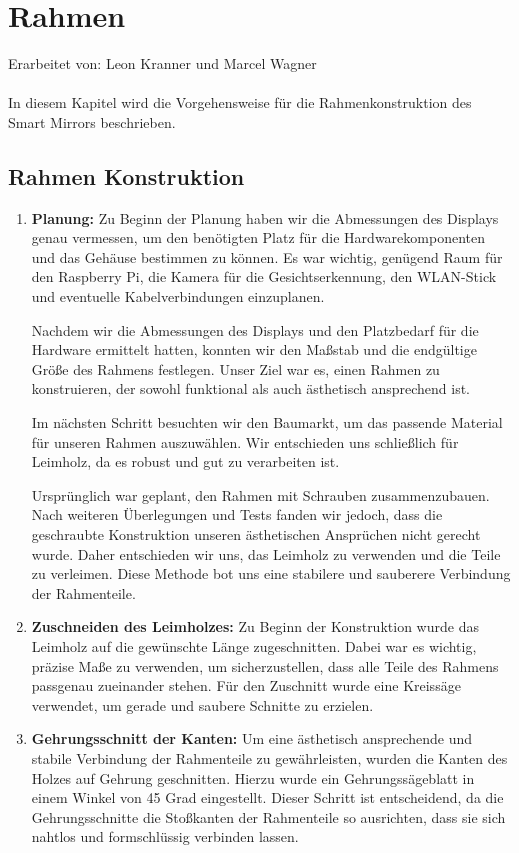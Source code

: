 \chapter{Rahmen}
Erarbeitet von: Leon Kranner und Marcel Wagner \\ \\
\noindent
In diesem Kapitel wird die Vorgehensweise für die Rahmenkonstruktion des Smart Mirrors beschrieben.

\section{Rahmen Konstruktion}
\begin{enumerate}
    \item \textbf{Planung:}
Zu Beginn der Planung haben wir die Abmessungen des Displays genau vermessen, um den benötigten Platz für die Hardwarekomponenten und das Gehäuse bestimmen zu können. Es war wichtig, genügend Raum für den Raspberry Pi, die Kamera für die Gesichtserkennung, den WLAN-Stick und eventuelle Kabelverbindungen einzuplanen.

Nachdem wir die Abmessungen des Displays und den Platzbedarf für die Hardware ermittelt hatten, konnten wir den Maßstab und die endgültige Größe des Rahmens festlegen. Unser Ziel war es, einen Rahmen zu konstruieren, der sowohl funktional als auch ästhetisch ansprechend ist.

Im nächsten Schritt besuchten wir den Baumarkt, um das passende Material für unseren Rahmen auszuwählen. Wir entschieden uns schließlich für Leimholz, da es robust und gut zu verarbeiten ist.

Ursprünglich war geplant, den Rahmen mit Schrauben zusammenzubauen. Nach weiteren Überlegungen und Tests fanden wir jedoch, dass die geschraubte Konstruktion unseren ästhetischen Ansprüchen nicht gerecht wurde. Daher entschieden wir uns, das Leimholz zu verwenden und die Teile zu verleimen. Diese Methode bot uns eine stabilere und sauberere Verbindung der Rahmenteile.
    \item \textbf{Zuschneiden des Leimholzes:}
    Zu Beginn der Konstruktion wurde das Leimholz auf die gewünschte Länge zugeschnitten. Dabei war es wichtig, präzise Maße zu verwenden, um sicherzustellen, dass alle Teile des Rahmens passgenau zueinander stehen. Für den Zuschnitt wurde eine Kreissäge verwendet, um gerade und saubere Schnitte zu erzielen.
    
    \item \textbf{Gehrungsschnitt der Kanten:}
    Um eine ästhetisch ansprechende und stabile Verbindung der Rahmenteile zu gewährleisten, wurden die Kanten des Holzes auf Gehrung geschnitten. Hierzu wurde ein Gehrungssägeblatt in einem Winkel von 45 Grad eingestellt. Dieser Schritt ist entscheidend, da die Gehrungsschnitte die Stoßkanten der Rahmenteile so ausrichten, dass sie sich nahtlos und formschlüssig verbinden lassen.
    

\end{enumerate}
